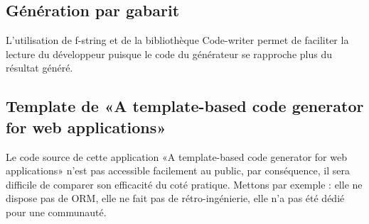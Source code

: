 \subsection{Génération par gabarit}

L’utilisation de f-string et de la bibliothèque Code-writer permet de faciliter la lecture du développeur puisque le code du générateur se rapproche plus du résultat généré.

\subsection{Template de «A template-based code generator for web applications»}
Le code source de cette application «A template-based code generator for web applications» n’est pas accessible facilement au public, par conséquence, il sera difficile de comparer son efficacité du coté pratique. Mettons par exemple : elle ne dispose pas de ORM, elle ne fait pas de rétro-ingénierie, elle n'a pas été dédié pour une communauté.
